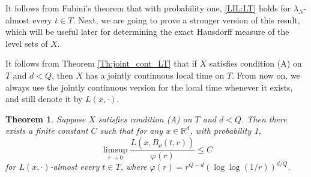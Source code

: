 \documentclass[11pt, reqno]{amsart}
\newtheorem{theorem}{Theorem}[section]
\def\R{{\mathbb R}}
\numberwithin{equation}{section}
\begin{document}
It follows from Fubini's theorem that with probability one, \eqref{LIL:LT} holds for $\lambda_N$-almost every $t \in T$.
Next, we are going to prove a stronger version of this result, which will be useful later for determining the exact 
Hausdorff measure of the level sets of $X$.

It follows from Theorem \ref{Th:joint_cont_LT} that if $X$ satisfies condition (A) on $T$ and $d < Q$, 
then $X$ has a jointly continuous local time on $T$. 
From now on, we always use the jointly continuous version for the local time whenever it exists, and still denote 
it by $L(x, \cdot)$.

\begin{theorem}\label{Thm:Holder_LT}
Suppose $X$ satisfies condition \textup{(A)} on $T$ and $d < Q$.
Then there exists a finite constant $C$ such that for any $x \in \R^d$,
with probability 1, 
\begin{equation}\label{Eq:Holder_LT}
\limsup_{r \to 0} \frac{L(x, B_\rho(t, r))}{\varphi(r)} \le C
\end{equation}
for $L(x, \cdot)$-almost every $t \in T$, where $\varphi(r) = r^{Q-d}(\log\log(1/r))^{d/Q}$.
\end{theorem}
\end{document}
